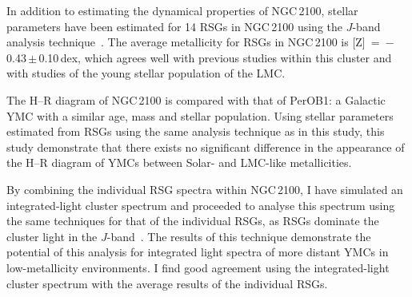 In addition to estimating the dynamical properties of NGC\,2100,
stellar parameters have been estimated for 14 RSGs in NGC\,2100 using the $J$-band analysis technique~\citep{2010MNRAS.407.1203D}.
The average metallicity for RSGs in NGC\,2100 is [Z]~=~$-$0.43\,$\pm$\,0.10\,dex, which agrees well with previous studies within this cluster and with studies of the young stellar population of the LMC.

The H--R diagram of NGC\,2100 is compared with that of PerOB1: a Galactic YMC with a similar age, mass and stellar population.
Using stellar parameters estimated from RSGs using the same analysis technique as in this study,
this study demonstrate that there exists no significant difference in the appearance of the H--R diagram of YMCs between Solar- and LMC-like metallicities.

By combining the individual RSG spectra within NGC\,2100, I have simulated an integrated-light cluster spectrum and proceeded to analyse this spectrum using the same techniques for that of the individual RSGs, as RSGs dominate the cluster light in the $J$-band~\citep{2013MNRAS.430L..35G}.
The results of this technique demonstrate the potential of this analysis for integrated light spectra of more distant YMCs in low-metallicity environments.
I find good agreement using the integrated-light cluster spectrum with the average results of the individual RSGs.

